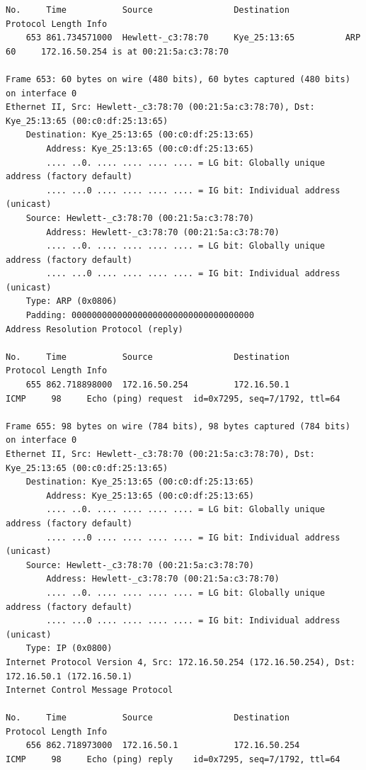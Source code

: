 \documentclass[a4paper,11pt]{article}
\begin{document}
\begin{lstlisting}
No.     Time           Source                Destination           Protocol Length Info
    653 861.734571000  Hewlett-_c3:78:70     Kye_25:13:65          ARP      60     172.16.50.254 is at 00:21:5a:c3:78:70

Frame 653: 60 bytes on wire (480 bits), 60 bytes captured (480 bits) on interface 0
Ethernet II, Src: Hewlett-_c3:78:70 (00:21:5a:c3:78:70), Dst: Kye_25:13:65 (00:c0:df:25:13:65)
    Destination: Kye_25:13:65 (00:c0:df:25:13:65)
        Address: Kye_25:13:65 (00:c0:df:25:13:65)
        .... ..0. .... .... .... .... = LG bit: Globally unique address (factory default)
        .... ...0 .... .... .... .... = IG bit: Individual address (unicast)
    Source: Hewlett-_c3:78:70 (00:21:5a:c3:78:70)
        Address: Hewlett-_c3:78:70 (00:21:5a:c3:78:70)
        .... ..0. .... .... .... .... = LG bit: Globally unique address (factory default)
        .... ...0 .... .... .... .... = IG bit: Individual address (unicast)
    Type: ARP (0x0806)
    Padding: 000000000000000000000000000000000000
Address Resolution Protocol (reply)

No.     Time           Source                Destination           Protocol Length Info
    655 862.718898000  172.16.50.254         172.16.50.1           ICMP     98     Echo (ping) request  id=0x7295, seq=7/1792, ttl=64

Frame 655: 98 bytes on wire (784 bits), 98 bytes captured (784 bits) on interface 0
Ethernet II, Src: Hewlett-_c3:78:70 (00:21:5a:c3:78:70), Dst: Kye_25:13:65 (00:c0:df:25:13:65)
    Destination: Kye_25:13:65 (00:c0:df:25:13:65)
        Address: Kye_25:13:65 (00:c0:df:25:13:65)
        .... ..0. .... .... .... .... = LG bit: Globally unique address (factory default)
        .... ...0 .... .... .... .... = IG bit: Individual address (unicast)
    Source: Hewlett-_c3:78:70 (00:21:5a:c3:78:70)
        Address: Hewlett-_c3:78:70 (00:21:5a:c3:78:70)
        .... ..0. .... .... .... .... = LG bit: Globally unique address (factory default)
        .... ...0 .... .... .... .... = IG bit: Individual address (unicast)
    Type: IP (0x0800)
Internet Protocol Version 4, Src: 172.16.50.254 (172.16.50.254), Dst: 172.16.50.1 (172.16.50.1)
Internet Control Message Protocol

No.     Time           Source                Destination           Protocol Length Info
    656 862.718973000  172.16.50.1           172.16.50.254         ICMP     98     Echo (ping) reply    id=0x7295, seq=7/1792, ttl=64


\end{lstlisting}
\end{document}
